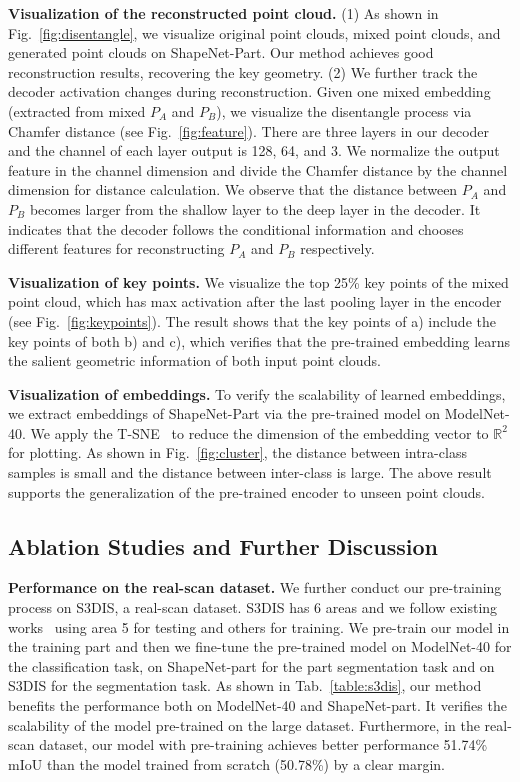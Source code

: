 \documentclass[journal]{IEEEtran}
\begin{document}
\textbf{Visualization of the reconstructed point cloud.} (1) As shown in Fig.~\ref{fig:disentangle}, we visualize original point clouds, mixed point clouds, and generated point clouds on ShapeNet-Part. 
Our method achieves good reconstruction results, recovering the key geometry. 
(2) We further track the decoder activation changes during reconstruction.  Given one mixed embedding (extracted from mixed $P_A$ and $P_B$), we visualize the disentangle process via Chamfer distance (see Fig.~\ref{fig:feature}). 
There are three layers in our decoder and the channel of each layer output is 128, 64, and 3.  We normalize the output feature in the channel dimension and divide the Chamfer distance by the channel dimension for distance calculation. We observe that the distance between $P_A$ and $P_B$ becomes larger from the shallow layer to the deep layer in the decoder. It indicates that the decoder follows the conditional information and chooses different features for reconstructing $P_A$ and $P_B$ respectively.


\textbf{Visualization of key points.} We visualize the top 25\% key points of the mixed point cloud, which has max activation after the last pooling layer in the encoder (see Fig.~\ref{fig:keypoints}). The result shows that the key points of a) include the key points of both b) and c), which verifies that the pre-trained embedding learns the salient geometric information of both input point clouds. 


\textbf{Visualization of embeddings.} To verify the scalability of learned embeddings, we extract embeddings of ShapeNet-Part via the pre-trained model on ModelNet-40. We apply the T-SNE~\cite{van2008visualizing} to reduce the dimension of the embedding vector to $\mathbb{R}^2$ for plotting. As shown in Fig.~\ref{fig:cluster}, the distance between intra-class samples is small and the distance between inter-class is large. The above result supports the generalization of the pre-trained encoder to unseen point clouds. 

\subsection{Ablation Studies and Further Discussion}

\textbf{Performance on the real-scan dataset.}
We further conduct our pre-training process on S3DIS, a real-scan dataset. S3DIS has 6 areas and we follow existing works~\cite{zhao2021point} using area 5 for testing and others for training. We pre-train our model in the training part and then we fine-tune the pre-trained model on ModelNet-40 for the classification task, on ShapeNet-part for the part segmentation task and on S3DIS for the segmentation task. As shown in Tab.~\ref{table:s3dis}, our method benefits the performance both on ModelNet-40 and ShapeNet-part. It verifies the scalability of the model pre-trained on the large dataset. 
Furthermore, in the real-scan dataset, our model with pre-training achieves better performance 51.74\% mIoU than the model trained from scratch (50.78\%) by a clear margin.
\end{document}
